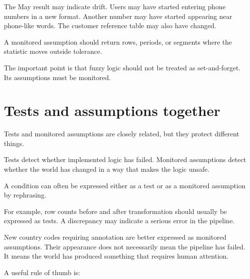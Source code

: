 \documentclass[10pt,openany,10pt]{book}
\begin{document}
The May result may indicate drift. Users may have started entering phone
numbers in a new format. Another number may have started appearing near
phone-like words. The customer reference table may also have changed.

A monitored assumption should return rows, periods, or segments where
the statistic moves outside tolerance.

The important point is that fuzzy logic should not be treated as
set-and-forget. Its assumptions must be monitored.

\section{Tests and assumptions
together}\label{tests-and-assumptions-together}

Tests and monitored assumptions are closely related, but they protect
different things.

Tests detect whether implemented logic has failed. Monitored assumptions
detect whether the world has changed in a way that makes the logic
unsafe.

A condition can often be expressed either as a test or as a monitored
assumption by rephrasing.

For example, row counts before and after transformation should usually
be expressed as tests. A discrepancy may indicate a serious error in the
pipeline.

New country codes requiring annotation are better expressed as monitored
assumptions. Their appearance does not necessarily mean the pipeline has
failed. It means the world has produced something that requires human
attention.

A useful rule of thumb is:
\end{document}
